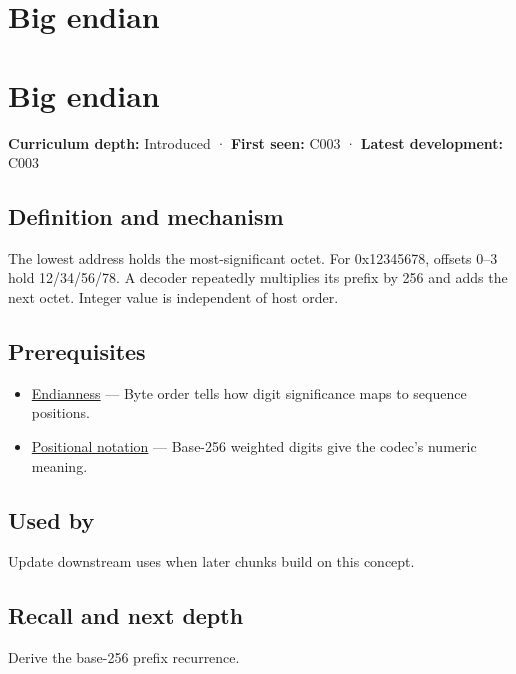 \hypertarget{appendix-92e040df969a}{}
\section*{Big endian}
\section{Big endian}\label{appendix-92e040df969a-big-endian}

\textbf{Curriculum depth:} Introduced · \textbf{First seen:} C003 · \textbf{Latest development:} C003

\subsection{Definition and mechanism}\label{appendix-92e040df969a-definition-and-mechanism}

The lowest address holds the most-significant octet. For 0x12345678, offsets 0--3 hold 12/34/56/78. A decoder repeatedly multiplies its prefix by 256 and adds the next octet. Integer value is independent of host order.

\subsection{Prerequisites}\label{appendix-92e040df969a-prerequisites}

\begin{itemize}
\tightlist
\item
  \hyperref[appendix-bc07c3d25b18]{Endianness} --- Byte order tells how digit significance maps to sequence positions.
\item
  \hyperref[appendix-83c3f28f7bda]{Positional notation} --- Base-256 weighted digits give the codec's numeric meaning.
\end{itemize}

\subsection{Used by}\label{appendix-92e040df969a-used-by}

Update downstream uses when later chunks build on this concept.

\subsection{Recall and next depth}\label{appendix-92e040df969a-recall-and-next-depth}

Derive the base-256 prefix recurrence.

